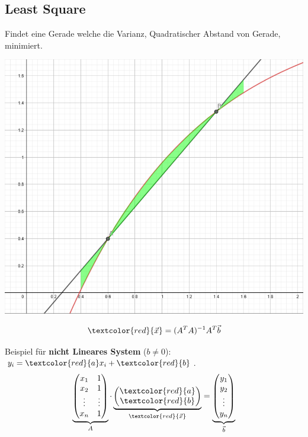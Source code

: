 \subsection{Least Square}
Findet eine Gerade welche die Varianz, Quadratischer Abstand von Gerade, minimiert. 
\begin{center}
	\begin{minipage}{0.20\textwidth}
		\begin{center}
			\includegraphics[width=\linewidth,keepaspectratio=true]{Images/leastsquare}\\
		\end{center}
	\end{minipage}%
	\begin{minipage}{0.3\textwidth}
		\[\textcolor{red}{\vec{x}} = (A^TA)^{-1}A^T\vec{b}\]
	\end{minipage}
\end{center}

\noindent
Beispiel für \textbf{nicht Lineares System} ($b\neq0$): $y_i = \textcolor{red}{a}x_i + \textcolor{red}{b}$.
\[
\underbrace{\begin{pmatrix}
		x_1 & 1 \\
		x_2 & 1 \\
		\vdots & \vdots \\
		x_n & 1
\end{pmatrix}}_{\scriptsize{A}}
\cdot
\underbrace{\begin{pmatrix}
		\textcolor{red}{a} \\
		\textcolor{red}{b}
\end{pmatrix}}_{\scriptsize{\textcolor{red}{\vec{x}}}}
=
\underbrace{\begin{pmatrix}
		y_1 \\
		y_2 \\
		\vdots \\
		y_n
\end{pmatrix}}_{\scriptsize{\vec{b}}}
\]